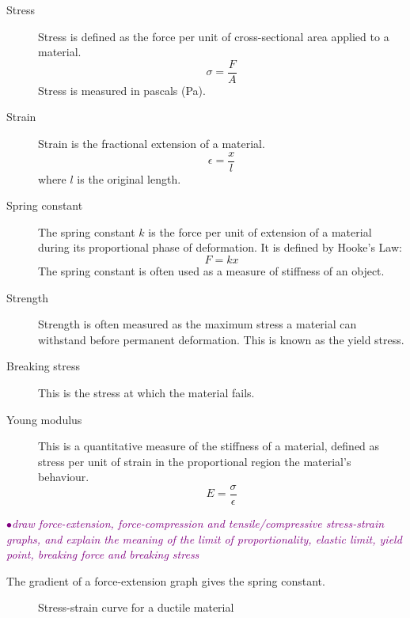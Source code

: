 \documentclass[a4paper,11pt,twoside]{memoir}
\newcounter{spec}[chapter]
\newcommand{\spec}[1]{\Needspace{5\baselineskip}\textcolor{purple}{$\bullet$\hspace{0.5cm}\textit{#1}}}
\begin{document}
\begin{description}
    \item[Stress] Stress is defined as the force per unit of cross-sectional area applied to a material. \[ \sigma = \frac{F}{A} \] Stress is measured in pascals (Pa).
    \item[Strain] Strain is the fractional extension of a material. \[ \epsilon = \frac{x}{l} \]
    where $l$ is the original length.
    \item[Spring constant] The spring constant $k$ is the force per unit of extension of a material during its proportional phase of deformation. It is defined by Hooke's Law: \[ F = kx\] The spring constant is often used as a measure of stiffness of an object.
    \item[Strength] Strength is often measured as the maximum stress a material can withstand before permanent deformation. This is known as the yield stress.
    \item[Breaking stress] This is the stress at which the material fails.
    \item[Young modulus] This is a quantitative measure of the stiffness of a material, defined as stress per unit of strain in the proportional region the material's behaviour. \[ E = \frac{\sigma}{\epsilon} \]
\end{description}

\spec{draw force-extension, force-compression and tensile/compressive stress-strain graphs, and explain the meaning of the limit of proportionality, elastic limit, yield point, breaking force and breaking stress}

The gradient of a force-extension graph gives the spring constant.

\begin{figure}[ht]
    \begin{center}
    \end{center}
    \caption{Stress-strain curve for a ductile material}
    \label{stress-strain}
\end{figure}
\end{document}
